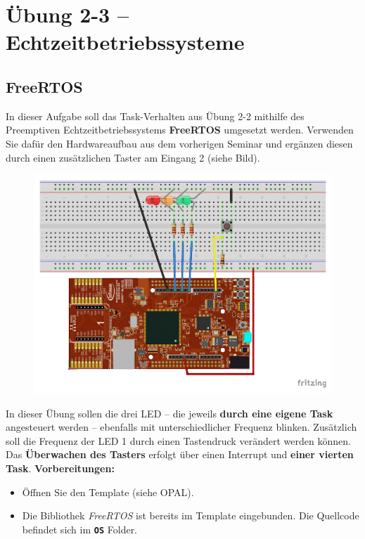 \documentclass[
    fontsize=12pt,                      %
    paper=a4,                           %
    twoside=off,                       %
    DIV=15,                             %
    BCOR=12mm,                          %
    headings=normal,                    %
    headsepline=false,                   %
    footsepline=false,                  %
    headinclude=true,                   %
    footinclude=false,                  %
    toc=listof,                         %
    toc=bib,                            %
    chapterprefix=false,                %
    appendixprefix=false,               %
    numbers=noendperiod,                %
    captions=tableabove,                %
    footnotes=multiple,                 %
    bibliography=oldstyle,              %
    draft=false,                        %
]{scrreprt}
\newcommand{\Farbcode}[1]{\texttt{\textbf{\textcolor{myred}{#1}}}}
\begin{document}
\chapter*{Übung 2-3 -- Echtzeitbetriebssysteme}

\section*{FreeRTOS}

In dieser Aufgabe soll das Task-Verhalten aus Übung 2-2 mithilfe des Preemptiven Echtzeitbetriebssystems \textbf{FreeRTOS} umgesetzt werden. Verwenden Sie dafür den Hardwareaufbau aus dem vorherigen Seminar und ergänzen diesen durch einen zusätzlichen Taster am Eingang 2 (siehe Bild).
\begin{figure}[H]
	\centering
	\includegraphics[width=\textwidth]{Figures/Scheduler2_Steckplatine}
\end{figure}
\noindent
In dieser Übung sollen die drei LED -- die jeweils \textbf{durch eine eigene Task} angesteuert werden -- ebenfalls mit unterschiedlicher Frequenz blinken. Zusätzlich soll die Frequenz der LED 1 durch einen Tastendruck verändert werden können. Das \textbf{Überwachen des Tasters} erfolgt über einen Interrupt und \textbf{einer vierten Task}.
\newpage
\noindent
\textbf{Vorbereitungen:}

\begin{itemize}
\item Öffnen Sie den Template (siehe OPAL).
\item Die Bibliothek \emph{FreeRTOS} ist bereits im Template eingebunden. Die Quellcode befindet sich im \Farbcode{OS} Folder.
\end{itemize}
\end{document}
